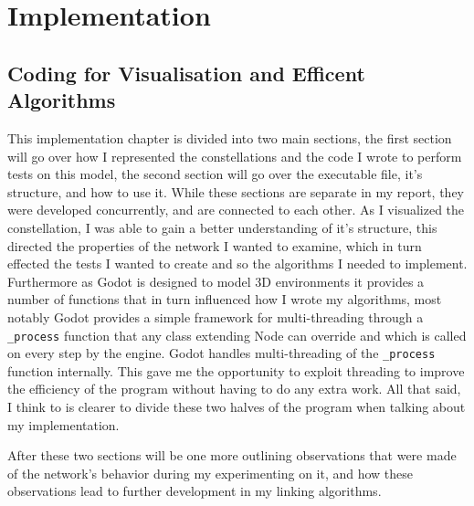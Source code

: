 \documentclass[12pt,a4paper,twoside,openright]{report}
\begin{document}
\chapter{Implementation}

\section{Coding for Visualisation and Efficent Algorithms}

This implementation chapter is divided into two main sections, the first section will go over how I represented the constellations and the code I wrote to perform tests on this model, the second section will go over the executable file, it's structure, and how to use it. While these sections are separate in my report, they were developed concurrently, and are connected to each other.  As I visualized the constellation, I was able to gain a better understanding of it's structure, this directed the properties of the network I wanted to examine, which in turn effected the tests I wanted to create and so the algorithms I needed to implement. Furthermore as Godot is designed to model 3D environments it provides a number of functions that in turn influenced how I wrote my algorithms, most notably Godot provides a simple framework for multi-threading through a \lstinline{_process} function that any class extending Node can override and which is called on every step by the engine. Godot handles multi-threading of the \lstinline{_process} function internally. This gave me the opportunity to exploit threading to improve the efficiency of the program without having to do any extra work. All that said, I think to is clearer to divide these two halves of the program when talking about my implementation.

After these two sections will be one more outlining observations that were made of the network's behavior during my experimenting on it, and how these observations lead to further development in my linking algorithms.
\end{document}
